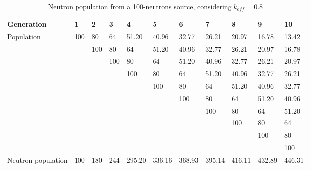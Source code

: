 \begin{table}[!htb]
\small
    \centering
\begin{tabular}{lllllllllll}
Generation         & 1   & 2   & 3   & 4   & 5   & 6   & 7   & 8   & 9   & 10  \\ \hline\hline
\multirow{10}{*}{Population}         & 100 & 80  & 64  & 51.20  & 40.96  & 32.77  & 26.21  & 20.97  & 16.78  & 13.42  \\
                   &        & 100 & 80  & 64  & 51.20  & 40.96  & 32.77  & 26.21  & 20.97  & 16.78  \\
                   &        &        & 100 & 80  & 64  & 51.20  & 40.96  & 32.77  & 26.21  & 20.97  \\
                   &        &        &        & 100 & 80  & 64  & 51.20  & 40.96  & 32.77  & 26.21  \\
                   &        &        &        &        & 100 & 80  & 64  & 51.20  & 40.96  & 32.77  \\
                   &        &        &        &        &        & 100 & 80  & 64  & 51.20  & 40.96  \\
                   &        &        &        &        &        &        & 100 & 80  & 64  & 51.20  \\
                   &        &        &        &        &        &        &        & 100 & 80  & 64  \\
                   &        &        &        &        &        &        &        &        & 100 & 80  \\
                   &        &        &        &        &        &        &        &        &        & 100 \\ \hline
Neutron population & 100 & 180 & 244 & 295.20 & 336.16 & 368.93 & 395.14 & 416.11 & 432.89 & 446.31
\end{tabular}
        \caption{Neutron population from a 100-neutrons source, considering $k_{eff} = 0.8$}\label{tab:keff08}
\end{table}




